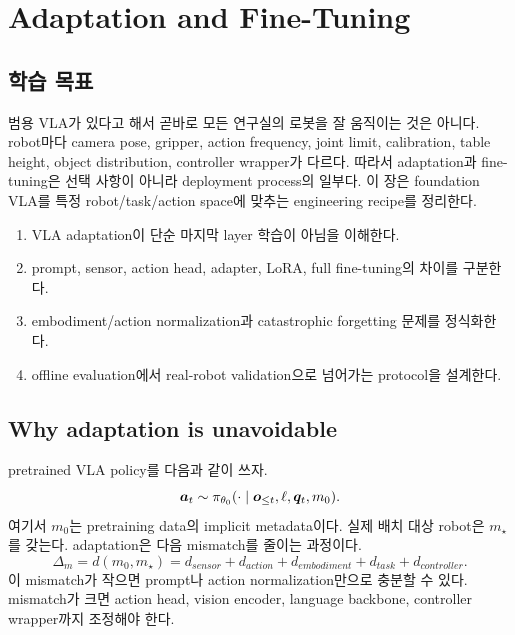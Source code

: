 \chapter{Adaptation and Fine-Tuning}

\section*{학습 목표}

범용 VLA가 있다고 해서 곧바로 모든 연구실의 로봇을 잘 움직이는 것은 아니다. robot마다 camera pose, gripper, action frequency, joint limit, calibration, table height, object distribution, controller wrapper가 다르다. 따라서 adaptation과 fine-tuning은 선택 사항이 아니라 deployment process의 일부다. 이 장은 foundation VLA를 특정 robot/task/action space에 맞추는 engineering recipe를 정리한다.

\begin{enumerate}
  \item VLA adaptation이 단순 마지막 layer 학습이 아님을 이해한다.
  \item prompt, sensor, action head, adapter, LoRA, full fine-tuning의 차이를 구분한다.
  \item embodiment/action normalization과 catastrophic forgetting 문제를 정식화한다.
  \item offline evaluation에서 real-robot validation으로 넘어가는 protocol을 설계한다.
\end{enumerate}

\section{Why adaptation is unavoidable}

pretrained VLA policy를 다음과 같이 쓰자.
\begin{equation}
  \bm{a}_t
  \sim
  \pi_{\theta_0}
  (\cdot \mid \bm{o}_{\leq t},\ell,\bm{q}_t,m_0).
  \label{eq:ch15-pretrained-policy}
\end{equation}
여기서 $m_0$는 pretraining data의 implicit metadata이다. 실제 배치 대상 robot은 $m_{\star}$를 갖는다. adaptation은 다음 mismatch를 줄이는 과정이다.
\begin{equation}
  \Delta_m
  =
  d(m_0,m_{\star})
  =
  d_{sensor}
  +
  d_{action}
  +
  d_{embodiment}
  +
  d_{task}
  +
  d_{controller}.
  \label{eq:ch15-metadata-mismatch}
\end{equation}
이 mismatch가 작으면 prompt나 action normalization만으로 충분할 수 있다. mismatch가 크면 action head, vision encoder, language backbone, controller wrapper까지 조정해야 한다.

